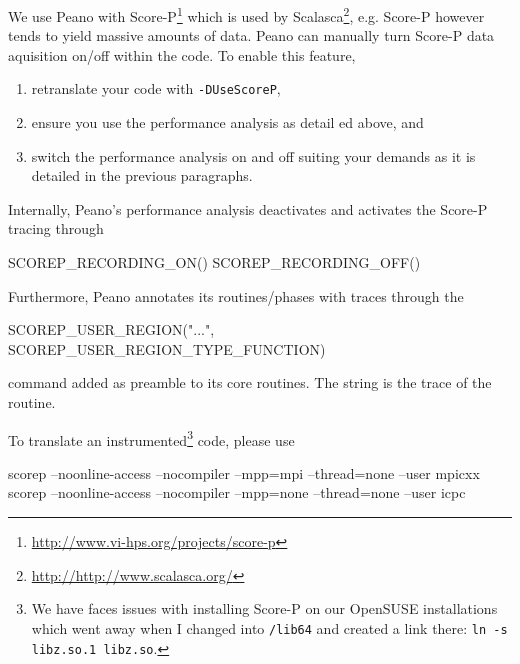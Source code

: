 We use Peano with Score-P\footnote{\url{http://www.vi-hps.org/projects/score-p}}
which is used by Scalasca\footnote{\url{http://http://www.scalasca.org/}}, e.g.
Score-P however tends to yield massive amounts of data. 
Peano can manually turn Score-P data aquisition on/off within the code. 
To enable this feature,
\begin{enumerate}
  \item retranslate your code with \texttt{-DUseScoreP},
  \item ensure you use the performance analysis as detail ed above, and
  \item switch the performance analysis on and off suiting your demands as it is
  detailed in the previous paragraphs.
\end{enumerate}


\noindent
Internally, Peano's performance analysis deactivates and activates the Score-P
tracing through
\begin{code}
SCOREP_RECORDING_ON()
SCOREP_RECORDING_OFF()
\end{code}

\noindent 
Furthermore, Peano annotates its routines/phases with traces through the 
\begin{code} 
SCOREP_USER_REGION("...", SCOREP_USER_REGION_TYPE_FUNCTION)
\end{code}
command added as preamble to its core routines. 
The string is the trace of the routine.


To translate an instrumented\footnote{
  We have faces issues with installing Score-P on our OpenSUSE installations which went away when I changed into 
  \texttt{/lib64} and created a link there: \texttt{ln -s libz.so.1 libz.so}.
} 
code, please use
\begin{code}
scorep --noonline-access --nocompiler --mpp=mpi  --thread=none --user mpicxx
scorep --noonline-access --nocompiler --mpp=none  --thread=none --user icpc
\end{code}


